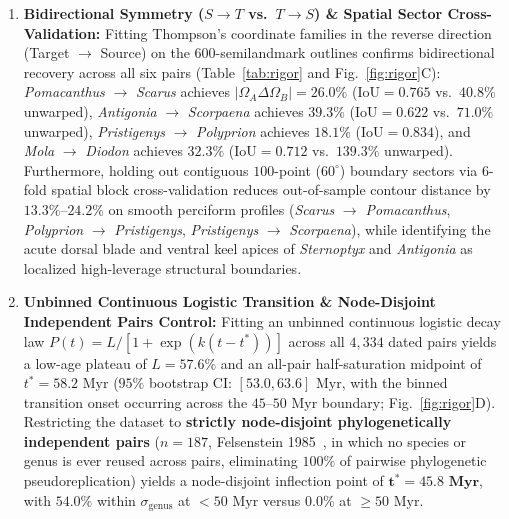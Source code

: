 \documentclass[11pt,a4paper]{article}
\theoremstyle{definition}
\theoremstyle{remark}
\newcommand{\IoU}{\mathrm{IoU}}
\begin{document}
\begin{enumerate}
  \item \textbf{Bidirectional Symmetry ($S \to T$ vs.\ $T \to S$) \& Spatial Sector Cross-Validation:}
  Fitting Thompson's coordinate families in the reverse direction (Target $\to$ Source) on the 600-semilandmark outlines confirms bidirectional recovery across all six pairs (Table~\ref{tab:rigor} and Fig.~\ref{fig:rigor}C): \emph{Pomacanthus} $\to$ \emph{Scarus} achieves $|\Omega_A \Delta \Omega_B| = \mathbf{26.0\%}$ ($\IoU = \mathbf{0.765}$ vs.\ $40.8\%$ unwarped), \emph{Antigonia} $\to$ \emph{Scorpaena} achieves $\mathbf{39.3\%}$ ($\IoU = \mathbf{0.622}$ vs.\ $71.0\%$ unwarped), \emph{Pristigenys} $\to$ \emph{Polyprion} achieves $\mathbf{18.1\%}$ ($\IoU = \mathbf{0.834}$), and \emph{Mola} $\to$ \emph{Diodon} achieves $\mathbf{32.3\%}$ ($\IoU = \mathbf{0.712}$ vs.\ $139.3\%$ unwarped). Furthermore, holding out contiguous $100$-point ($60^\circ$) boundary sectors via 6-fold spatial block cross-validation reduces out-of-sample contour distance by $13.3\%\text{--}24.2\%$ on smooth perciform profiles (\emph{Scarus} $\to$ \emph{Pomacanthus}, \emph{Polyprion} $\to$ \emph{Pristigenys}, \emph{Pristigenys} $\to$ \emph{Scorpaena}), while identifying the acute dorsal blade and ventral keel apices of \emph{Sternoptyx} and \emph{Antigonia} as localized high-leverage structural boundaries.

  \item \textbf{Unbinned Continuous Logistic Transition \& Node-Disjoint Independent Pairs Control:}
  Fitting an unbinned continuous logistic decay law $P(t) = L / [1 + \exp(k(t - t^*))]$ across all $4{,}334$ dated pairs yields a low-age plateau of $L = 57.6\%$ and an all-pair half-saturation midpoint of $t^* = 58.2\text{ Myr}$ ($95\%$ bootstrap CI: $[53.0, 63.6]\text{ Myr}$, with the binned transition onset occurring across the $45\text{--}50\text{ Myr}$ boundary; Fig.~\ref{fig:rigor}D). Restricting the dataset to \textbf{strictly node-disjoint phylogenetically independent pairs} ($n = 187$, Felsenstein 1985~\cite{Felsenstein1985}, in which no species or genus is ever reused across pairs, eliminating $100\%$ of pairwise phylogenetic pseudoreplication) yields a node-disjoint inflection point of $\mathbf{t^* = 45.8\text{ Myr}}$, with $\mathbf{54.0\%}$ within $\sigma_{\mathrm{genus}}$ at $< 50\text{ Myr}$ versus $\mathbf{0.0\%}$ at $\ge 50\text{ Myr}$.
\end{enumerate}
\end{document}
